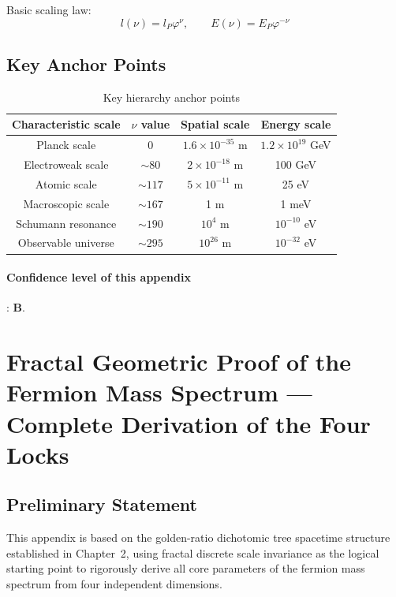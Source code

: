 \documentclass[12pt,a4paper,twocolumn]{article}
\renewcommand{\phi}{\varphi}
\begin{document}
Basic scaling law:
\[
l(\nu) = l_P \phi^\nu,\qquad E(\nu) = E_P \phi^{-\nu}
\]

\subsection{Key Anchor Points}
\begin{table}[H]
\centering
\footnotesize
\caption{Key hierarchy anchor points}
\begin{tabular}{c|c|c|c}
\hline
\textbf{Characteristic scale} & $\nu$ value & \textbf{Spatial scale} & \textbf{Energy scale} \\
\hline
Planck scale & 0 & $1.6\times10^{-35}$ m & $1.2\times10^{19}$ GeV \\
Electroweak scale & $\sim80$ & $2\times10^{-18}$ m & 100 GeV \\
Atomic scale & $\sim117$ & $5\times10^{-11}$ m & 25 eV \\
Macroscopic scale & $\sim167$ & 1 m & 1 meV \\
Schumann resonance & $\sim190$ & $10^4$ m & $10^{-10}$ eV \\
Observable universe & $\sim295$ & $10^{26}$ m & $10^{-32}$ eV \\
\hline
\end{tabular}
\end{table}

\paragraph{Confidence level of this appendix}: \textbf{B}.

\section{Fractal Geometric Proof of the Fermion Mass Spectrum --- Complete Derivation of the Four Locks}
\label{app:four_locks}

\subsection{Preliminary Statement}
This appendix is based on the golden-ratio dichotomic tree spacetime structure established in Chapter~2, using fractal discrete scale invariance as the logical starting point to rigorously derive all core parameters of the fermion mass spectrum from four independent dimensions.
\end{document}
